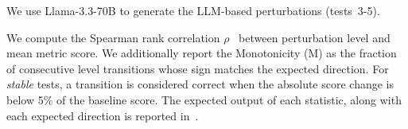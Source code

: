 We use Llama-3.3-70B to generate the LLM-based perturbations (tests~3-5). %

We compute the Spearman rank correlation $\rho$~\cite{spearman1904proof} between perturbation level and mean metric score. We additionally report the Monotonicity (M) as the fraction of consecutive level transitions whose sign matches the expected direction. For \emph{stable} tests, a transition is considered correct when the absolute score change is below 5\% of the baseline score.
The expected output of each statistic, along with each expected direction is reported in~.

